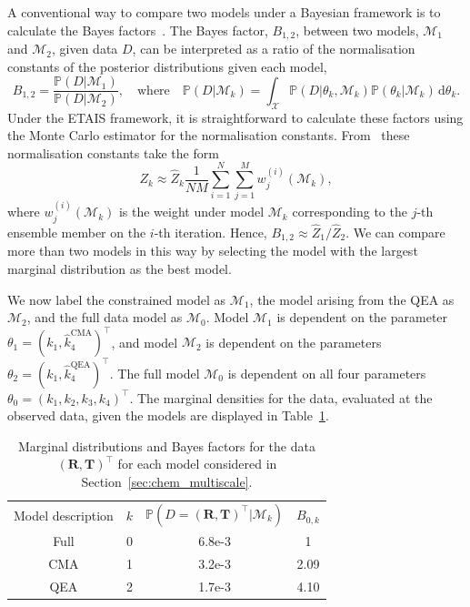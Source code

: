 \documentclass[final]{siamltex}
\begin{document}
A conventional way to compare two models under a Bayesian framework is
to calculate the Bayes factors~\cite{chen2012monte}. The Bayes factor,
$B_{1,2}$, between two models, $\mathcal{M}_1$ and $\mathcal{M}_2$,
given data $D$, can be interpreted as a ratio of the normalisation constants of the posterior distributions given each model,
\[
	B_{1,2} = \frac{\mathbb{P}(D|\mathcal{M}_1)}{\mathbb{P}(D|\mathcal{M}_2)}, \quad \text{where} \quad \mathbb{P}(D|\mathcal{M}_k) = \int_\mathcal{X} \mathbb{P}(D|\theta_k,\mathcal{M}_k)\mathbb{P}(\theta_k|\mathcal{M}_k) \, \text{d}\theta_k.
\]
Under the ETAIS framework, it is straightforward to calculate these factors using the Monte Carlo estimator for the normalisation constants. From~\cite{robert2013monte} these normalisation constants take the form
\[
	Z_k \approx \hat{Z}_k\frac{1}{NM}\sum_{i=1}^N\sum_{j=1}^M w_j^{(i)}(\mathcal{M}_k),
\]
where $w_j^{(i)}(\mathcal{M}_k)$ is the weight under model $\mathcal{M}_k$ corresponding to the $j$-th ensemble member on the $i$-th iteration. Hence, $B_{1,2} \approx \hat{Z}_1/\hat{Z}_2$. We can compare more than two models in this way by selecting the model with the largest marginal distribution as the best model.

We now label the constrained model as $\mathcal{M}_1$, the model
arising from the QEA as $\mathcal{M}_2$, and the full data model as
$\mathcal{M}_0$. Model $\mathcal{M}_1$ is dependent on the parameter
$\theta_1 = (k_1, \hat{k}_4^{\text{CMA}})^\top$, and model
$\mathcal{M}_2$ is dependent on the parameters $\theta_2 = (k_1,
\hat{k}_4^{\text{QEA}})^\top$. The full model $\mathcal{M}_0$ is
dependent on all four parameters $\theta_0 = (k_1, k_2, k_3, k_4)^\top$. The marginal densities for the data, evaluated at the observed data, given the models are displayed in Table~\ref{tab:chem_Bayes_marginals}.

\begin{table}[!htb]
\centering
\begin{tabular}{cccc}
	\toprule
	Model description & $k$ & \quad $\mathbb{P}(D =
                                  (\mathbf{R},\mathbf{T})^\top|\mathcal{M}_k)$
  & $B_{0,k}$ \\ \cmidrule(lr){1-4}
	Full & 0 & 6.8e-3 & 1 \\
	CMA & 1 & 3.2e-3 & 2.09 \\
	QEA & 2 & 1.7e-3 & 4.10 \\ \bottomrule
\end{tabular}
\caption{Marginal distributions and Bayes factors for the data $(\mathbf{R},\mathbf{T})^\top$ for each model considered in Section~\ref{sec:chem_multiscale}.}
\label{tab:chem_Bayes_marginals}
\end{table}
\end{document}
